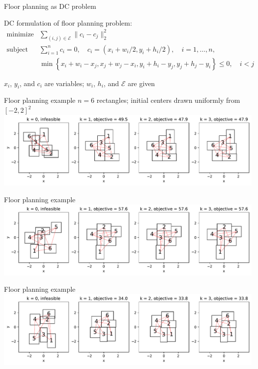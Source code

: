 \documentclass[aspectratio=169,11pt]{beamer}
\begin{document}
\begin{frame}{Floor planning as DC problem}
\BIT
\item DC formulation of floor planning problem:
\[
\begin{array}{ll}
\mbox{minimize}
& \sum_{(i, j) \in \mathcal{E}} \|c_i - c_j\|_2^2\\
\mbox{subject to}
& \sum_{i=1}^n c_i = 0, \quad c_i = (x_i+w_i/2, y_i + h_i/2), \quad i = 1,\ldots, n,\\
& \min \left\{x_i+w_i-x_j, x_j+w_j-x_i, y_i+h_i-y_j, y_j+h_j-y_i\right\} \leq 0, \quad i < j
\end{array}
\]
\item $x_i$, $y_i$, and $c_i$ are variables;
$w_i$, $h_i$, and $\mathcal{E}$ are given
\EIT
\end{frame}

\begin{frame}{Floor planning example}
$n=6$ rectangles; initial centers drawn uniformly from $[-2, 2]^2$
\vfill
\centering
\includegraphics[width=\textwidth]{floor_planning_seed23.pdf}
\end{frame}

\begin{frame}{Floor planning example}
\centering
\includegraphics[width=\textwidth]{floor_planning_seed11.pdf}
\end{frame}

\begin{frame}{Floor planning example}
\centering
\includegraphics[width=\textwidth]{floor_planning_seed10.pdf}
\end{frame}
\end{document}
